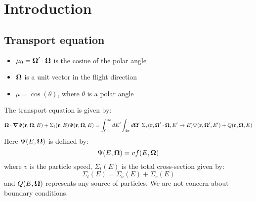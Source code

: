 \chapter{Introduction}
\section{Transport equation}
\begin{itemize}
\item $\mu_0 = \boldsymbol{\Omega}'\cdot \boldsymbol{\Omega}$ is the cosine of the polar angle
\item $\boldsymbol{\Omega}$ is a unit vector in the flight direction
\item $\mu = \cos(\theta)$, where $\theta$ is a polar angle
\end{itemize}
The transport equation is given by:
\begin{equation}
\bo\cdot \bn \Psi(\br,\bo,E) + \Sigma_t(\br,E)\Psi(\br,\bo,E) =
\int_0^{\infty}dE'\int_{4\pi}d\bo'\ 
\Sigma_s(\br,\bo'\cdot\bo,E'\rightarrow E)\Psi(\br,\bo',E')+Q(\br,\bo,E)
\label{transport_p}
\end{equation}
Here $\Psi(E,\boldsymbol{\Omega})$ is defined by:
\begin{equation}
\Psi(E,\boldsymbol{\Omega}) = vf(E,\boldsymbol{\Omega})
\end{equation}
where $v$ is the particle speed, $\Sigma_t(E)$ is the total cross-section
given by:
\begin{equation}
\Sigma_t(E) = \Sigma_a(E)+\Sigma_s(E)
\end{equation}
and $Q(E,\boldsymbol{\Omega})$ represents any source of particles. We are not concern about
boundary conditions.


